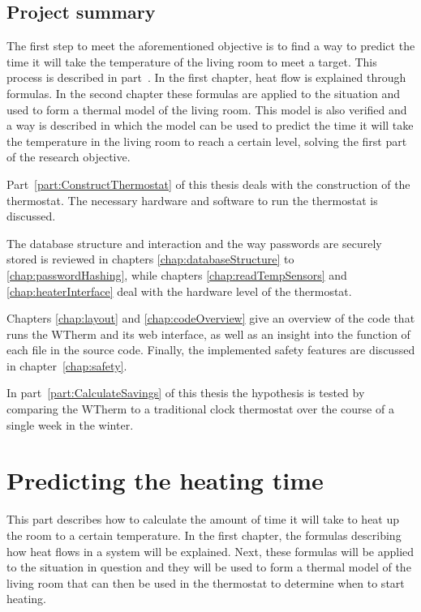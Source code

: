 \documentclass[12pt,a4paper,final]{report}
\begin{document}
\chapter*{Project summary}
The first step to meet the aforementioned objective is to find a way to predict the time it will take the temperature of the living room to meet a target. This process is described in part~\ref{part:PredictHeatingTime}. In the first chapter, heat flow is explained through formulas. In the second chapter these formulas are applied to the situation and used to form a thermal model of the living room. This model is also verified and a way is described in which the model can be used to predict the time it will take the temperature in the living room to reach a certain level, solving the first part of the research objective.
 
Part~\ref{part:ConstructThermostat} of this thesis deals with the construction of the thermostat. The necessary hardware and software to run the thermostat is discussed. 

The database structure and interaction and the way passwords are securely stored is reviewed in chapters \ref{chap:databaseStructure} to \ref{chap:passwordHashing}, while chapters \ref{chap:readTempSensors} and \ref{chap:heaterInterface} deal with the hardware level of the thermostat.

Chapters \ref{chap:layout} and \ref{chap:codeOverview} give an overview of the code that runs the WTherm and its web interface, as well as an insight into the function of each file in the source code. Finally, the implemented safety features are discussed in chapter~\ref{chap:safety}.
 
In part~\ref{part:CalculateSavings} of this thesis the hypothesis is tested by comparing the WTherm to a traditional clock thermostat over the course of a single week in the winter.

\part{Predicting the heating time} \label{part:PredictHeatingTime}
This part describes how to calculate the amount of time it will take to heat up the room to a certain temperature. In the first chapter, the formulas describing how heat flows in a system will be explained. Next, these formulas will be applied to the situation in question and they will be used to form a thermal model of the living room that can then be used in the thermostat to determine when to start heating.
\end{document}
